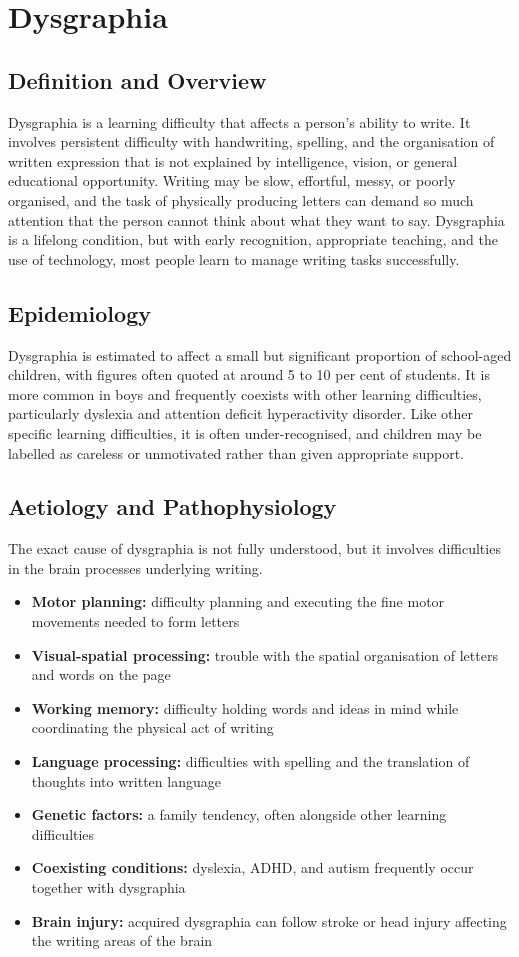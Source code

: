 \chapter{Dysgraphia}

\section*{Definition and Overview}
Dysgraphia is a learning difficulty that affects a person's ability to write. It involves persistent difficulty with handwriting, spelling, and the organisation of written expression that is not explained by intelligence, vision, or general educational opportunity. Writing may be slow, effortful, messy, or poorly organised, and the task of physically producing letters can demand so much attention that the person cannot think about what they want to say. Dysgraphia is a lifelong condition, but with early recognition, appropriate teaching, and the use of technology, most people learn to manage writing tasks successfully.

\section*{Epidemiology}
Dysgraphia is estimated to affect a small but significant proportion of school-aged children, with figures often quoted at around 5 to 10 per cent of students. It is more common in boys and frequently coexists with other learning difficulties, particularly dyslexia and attention deficit hyperactivity disorder. Like other specific learning difficulties, it is often under-recognised, and children may be labelled as careless or unmotivated rather than given appropriate support.

\section*{Aetiology and Pathophysiology}
The exact cause of dysgraphia is not fully understood, but it involves difficulties in the brain processes underlying writing.
\begin{itemize}
    \item \textbf{Motor planning:} difficulty planning and executing the fine motor movements needed to form letters
    \item \textbf{Visual-spatial processing:} trouble with the spatial organisation of letters and words on the page
    \item \textbf{Working memory:} difficulty holding words and ideas in mind while coordinating the physical act of writing
    \item \textbf{Language processing:} difficulties with spelling and the translation of thoughts into written language
    \item \textbf{Genetic factors:} a family tendency, often alongside other learning difficulties
    \item \textbf{Coexisting conditions:} dyslexia, ADHD, and autism frequently occur together with dysgraphia
    \item \textbf{Brain injury:} acquired dysgraphia can follow stroke or head injury affecting the writing areas of the brain
\end{itemize}

